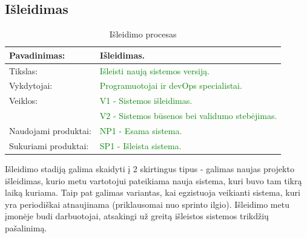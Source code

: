 \documentclass{VUMIFPSkursinis}
\begin{document}
	\subsection{Išleidimas}
	\begin{center}
		\begin{table}[ht]
			\caption{Išleidimo procesas}
			\begin{tabular}{ | l | l | }
				\hline
				Pavadinimas:         & Išleidimas.						\\ \hline
				Tikslas:             & \textcolor{green}{Išleisti naują sistemos versiją.}			\\ \hline
				Vykdytojai:          & \textcolor{green}{Programuotojai ir devOps specialistai.}		\\ \hline
				Veiklos:             & \textcolor{green}{V1 - Sistemos išleidimas. }				\\
				                     & \textcolor{green}{V2 - Sistemos būsenos bei validumo stebėjimas.}	\\ \hline
				Naudojami produktai: & \textcolor{green}{NP1 - Esama sistema.}					\\ \hline
				Sukuriami produktai: & \textcolor{green}{SP1 - Išleista sistema. }				\\ \hline
			\end{tabular}
		\end{table}
	\end{center}
	Išleidimo stadiją galima skaidyti į 2 skirtingus tipus - galimas naujas projekto išleidimas, kurio metu vartotojui pateikiama nauja sistema, kuri buvo tam tikrą laiką kuriama.
	Taip pat galimas variantas, kai egzistuoja veikianti sistema, kuri yra periodiškai atnaujinama (priklausomai nuo sprinto ilgio).
	Išleidimo metu įmonėje budi darbuotojai, atsakingi už greitą išleistos sistemos trikdžių pašalinimą.
	\newpage
\end{document}

